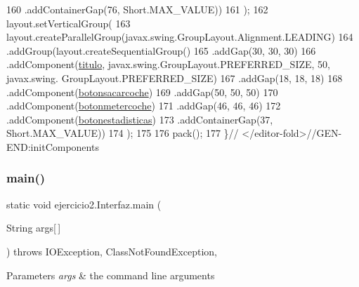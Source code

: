 \begin{DoxyCode}
160                 .addContainerGap(76, Short.MAX\_VALUE))
161         );
162         layout.setVerticalGroup(
163             layout.createParallelGroup(javax.swing.GroupLayout.Alignment.LEADING)
164             .addGroup(layout.createSequentialGroup()
165                 .addGap(30, 30, 30)
166                 .addComponent(\mbox{\hyperlink{classejercicio2_1_1_interfaz_af6343959b01523a71cdf2296b61672e0}{titulo}}, javax.swing.GroupLayout.PREFERRED\_SIZE, 50, javax.swing.
      GroupLayout.PREFERRED\_SIZE)
167                 .addGap(18, 18, 18)
168                 .addComponent(\mbox{\hyperlink{classejercicio2_1_1_interfaz_a643d25060e73ac4c53a95d7b4bfdae52}{botonsacarcoche}})
169                 .addGap(50, 50, 50)
170                 .addComponent(\mbox{\hyperlink{classejercicio2_1_1_interfaz_a312037c2c5b2cd0f23fd65998314ee09}{botonmetercoche}})
171                 .addGap(46, 46, 46)
172                 .addComponent(\mbox{\hyperlink{classejercicio2_1_1_interfaz_a7385c1fb6e098f60bb5a8b4b7a31fd65}{botonestadisticas}})
173                 .addContainerGap(37, Short.MAX\_VALUE))
174         );
175 
176         pack();
177     \}\textcolor{comment}{// </editor-fold>//GEN-END:initComponents}
\end{DoxyCode}
\mbox{\label{classejercicio2_1_1_interfaz_a0125ded86293cad4199da328fd7cc956}} 
\subsubsection{\texorpdfstring{main()}{main()}}
{\footnotesize\ttfamily static void ejercicio2.\+Interfaz.\+main (\begin{DoxyParamCaption}\item[{String}]{args\mbox{[}$\,$\mbox{]} }\end{DoxyParamCaption}) throws I\+O\+Exception, Class\+Not\+Found\+Exception\hspace{0.3cm}{\ttfamily [inline]}, {\ttfamily [static]}}


\begin{DoxyParams}{Parameters}
{\em args} & the command line arguments \\
\hline
\end{DoxyParams}

